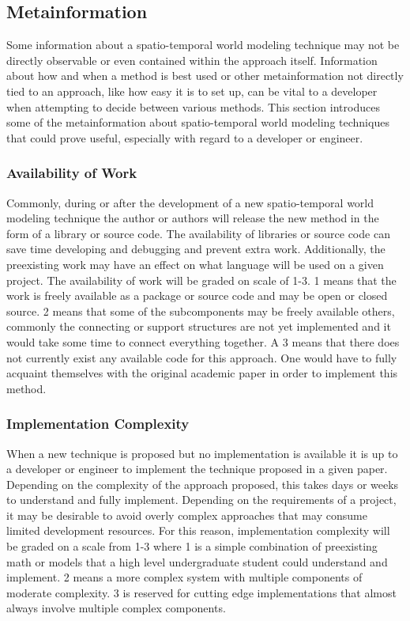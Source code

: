   \subsection{ Metainformation }

  Some information about a spatio-temporal world modeling technique may not be
  directly observable or even contained within the approach itself. Information
  about how and when a method is best used or other metainformation not directly
  tied to an approach, like how easy it is to set up, can be vital to a developer
  when attempting to decide between various methods. This section introduces
  some of the metainformation about spatio-temporal world modeling techniques
  that could prove useful, especially with regard to a developer or engineer. \\

  \subsubsection{ Availability of Work }
  Commonly, during or after the development of a new spatio-temporal world
  modeling technique the author or authors will release the new method in the
  form of a library or source code. The availability of libraries or source code
  can save time developing
  and debugging and prevent extra work. Additionally, the preexisting work may have an effect
  on what language will be used on a given project. The availability of work
  will be graded on scale of 1-3. 1 means that the work is
  freely available as a package or source code and may be open or closed source.
  2 means that some of the subcomponents may be freely available others,
  commonly the connecting or support structures are not yet implemented and it
  would take some time to connect everything together. A 3 means that there
  does not currently exist any available code for this approach. One would have
  to fully acquaint themselves with the original academic paper in order to
  implement this method. \\

  \subsubsection{ Implementation Complexity }
  When a new technique is proposed but no implementation is available it is
  up to a developer or engineer to implement the technique proposed in a given paper.
  Depending on the complexity of the approach proposed, this takes days or
  weeks to understand and fully implement. Depending
  on the requirements of a project, it may be desirable to avoid overly complex
  approaches that may consume limited development resources. For this reason,
  implementation complexity will be graded on a scale from 1-3 where 1 is a
  simple combination of preexisting math or models that a high
  level undergraduate student could understand and implement. 2 means a
  more complex system with multiple components of moderate complexity.
  3 is reserved for cutting edge implementations that almost always involve
  multiple complex components. \\

